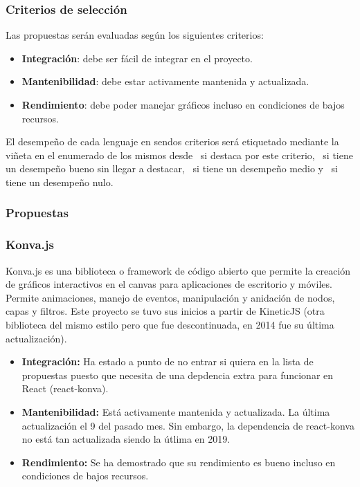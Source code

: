 \subsubsection{Criterios de selección}

Las propuestas serán evaluadas según los siguientes criterios:

\begin{itemize}
  \item \textbf{Integración}: debe ser fácil de integrar en el proyecto.
  \item \textbf{Mantenibilidad}: debe estar activamente mantenida y actualizada.
  \item \textbf{Rendimiento}: debe poder manejar gráficos incluso en condiciones de bajos recursos.
\end{itemize}

El desempeño de cada lenguaje en sendos criterios será etiquetado mediante la viñeta en el enumerado de los mismos desde \esp~si destaca por este criterio, \bien~si tiene un desempeño bueno sin llegar a destacar, \regular~si tiene un desempeño medio y \mal~si tiene un desempeño nulo.

\subsubsection{Propuestas}

\subsubsection{Konva.js}

Konva.js es una biblioteca o framework de código abierto que permite la creación de gráficos interactivos en el canvas para aplicaciones de escritorio y móviles. Permite animaciones, manejo de eventos, manipulación y anidación de nodos, capas y filtros. Este proyecto se tuvo sus inicios a partir de KineticJS (otra biblioteca del mismo estilo pero que fue descontinuada, en 2014 fue su última actualización).

\begin{itemize}
    \item[\regular] \textbf{Integración:} Ha estado a punto de no entrar si quiera en la lista de propuestas puesto que necesita de una depdencia extra para funcionar en React (react-konva).
    \item[\bien] \textbf{Mantenibilidad:} Está activamente mantenida y actualizada. La última actualización el 9 del pasado mes. Sin embargo, la dependencia de react-konva no está tan actualizada siendo la útlima en 2019.
    \item[\bien] \textbf{Rendimiento:} Se ha demostrado que su rendimiento es bueno incluso en condiciones de bajos recursos.
\end{itemize}

